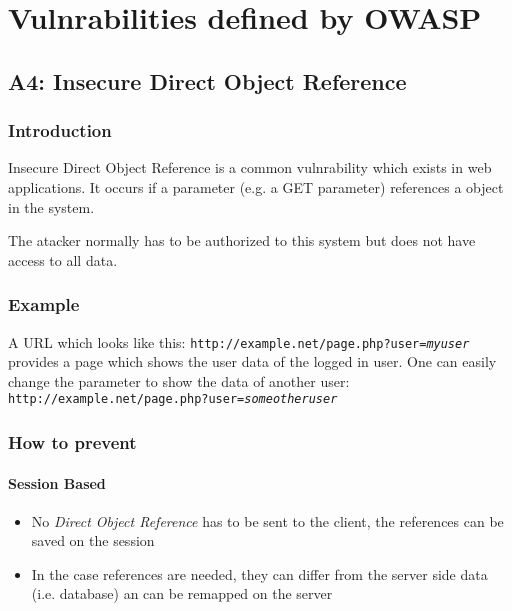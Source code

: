 \documentclass[11pt,twoside,a4paper]{article}
\title{\titleText}
\author{\authorText}
\date{\dateText}
\begin{document}
	\maketitle
	\tableofcontents
        
        \section{Vulnrabilities defined by OWASP}
        \subsection{A4: Insecure Direct Object Reference}
        
        \subsubsection{Introduction}
        Insecure Direct Object Reference is a common vulnrability which exists
        in web applications. It occurs if a parameter (e.g. a GET parameter)
        references a object in the system. 

        The atacker normally has to be authorized to this system but does not
        have access to all data.
        
        \subsubsection{Example}

        A URL which looks like this:
        \texttt{http://example.net/page.php?user=\textit{myuser}} provides a
        page which shows the user data of the logged in user. One can easily
        change the parameter to show the data of another user:
        \texttt{http://example.net/page.php?user=\textit{someotheruser}}
        
        \subsubsection{How to prevent}
        
        \paragraph{Session Based}
        
        \begin{itemize}
        	\item No \textit{Direct Object Reference} has to be sent to the client, the references can be saved on the session
        	\item In the case references are needed, they can differ from the server side data (i.e. database) an can be remapped on the server
        \end{itemize}
        
\end{document}
